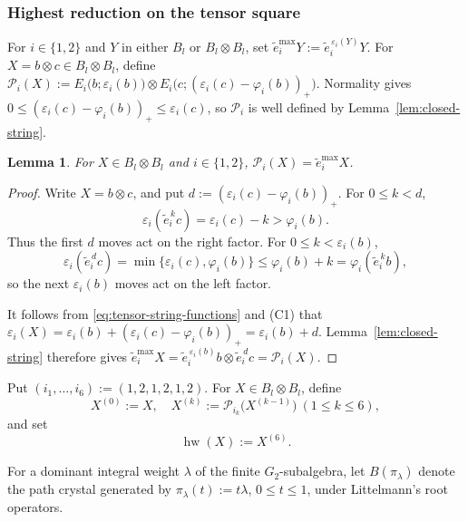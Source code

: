 \documentclass[11pt,reqno]{amsart}
\newcommand{\hw}{\operatorname{hw}}
\numberwithin{table}{section}
\numberwithin{equation}{section}
\theoremstyle{plain}
\newtheorem{lemma}[theorem]{Lemma}
\theoremstyle{definition}
\begin{document}
\subsubsection{Highest reduction on the tensor square}

For \(i\in\{1,2\}\) and \(Y\) in either \(B_l\) or
\(B_l\otimes B_l\), set $\widetilde e_i^{\max}Y
:=
\widetilde e_i^{\,\varepsilon_i(Y)}Y$.
For \(X=b\otimes c\in B_l\otimes B_l\), define $\mathcal P_i(X)
:=
E_i\bigl(b;\varepsilon_i(b)\bigr)
\otimes
E_i\bigl(c;(\varepsilon_i(c)-\varphi_i(b))_+\bigr)$.
Normality gives $0\le(\varepsilon_i(c)-\varphi_i(b))_+
\le\varepsilon_i(c)$,
so \(\mathcal P_i\) is well defined by
Lemma~\ref{lem:closed-string}.

\begin{lemma}\label{lem:Pi-emax}
	For \(X\in B_l\otimes B_l\) and \(i\in\{1,2\}\),
	\(\mathcal P_i(X)=\widetilde e_i^{\max}X\).
\end{lemma}

\begin{proof}
	Write \(X=b\otimes c\), and put
	\(d:=(\varepsilon_i(c)-\varphi_i(b))_+\).
	For \(0\le k<d\),
	\[
	\varepsilon_i(\widetilde e_i^{\,k}c)
	=
	\varepsilon_i(c)-k
	>
	\varphi_i(b).
	\]
	Thus the first \(d\) moves act on the right factor.
	For \(0\le k<\varepsilon_i(b)\),
	\[
	\varepsilon_i(\widetilde e_i^{\,d}c)
	=
	\min\{\varepsilon_i(c),\varphi_i(b)\}
	\le
	\varphi_i(b)+k
	=
	\varphi_i(\widetilde e_i^{\,k}b),
	\]
	so the next \(\varepsilon_i(b)\) moves act on the left factor.
	
	It follows from \eqref{eq:tensor-string-functions} and \textup{(C1)} that $\varepsilon_i(X)
	=
	\varepsilon_i(b)
	+
	(\varepsilon_i(c)-\varphi_i(b))_+
	=
	\varepsilon_i(b)+d$.
	Lemma~\ref{lem:closed-string} therefore gives $\widetilde e_i^{\max}X
	=
	\widetilde e_i^{\,\varepsilon_i(b)}b
	\otimes
	\widetilde e_i^{\,d}c
	=
	\mathcal P_i(X)$.
\end{proof}

Put \((i_1,\ldots,i_6):=(1,2,1,2,1,2)\).
For \(X\in B_l\otimes B_l\), define
\begin{equation}\label{eq:HW-recursion}
	X^{(0)}:=X,
	\quad
	X^{(k)}
	:=
	\mathcal P_{i_k}\bigl(X^{(k-1)}\bigr)
	\ (1\le k\le6),
\end{equation}
and set
\begin{equation}\label{eq:hw-def}
	\hw(X):=X^{(6)}.
\end{equation}

For a dominant integral weight \(\lambda\) of the finite
\(G_2\)-subalgebra, let \(B(\pi_\lambda)\) denote the path crystal
generated by \(\pi_\lambda(t):=t\lambda\), \(0\le t\le1\),
under Littelmann's root operators.
\end{document}
